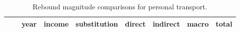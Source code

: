
\begin{table}
\footnotesize
\begin{center}
\caption{Rebound magnitude comparisons for personal transport.}
\label{tab:rebound_car_comparisons}
\begin{tabular}{ c l c c c c c c c }
\toprule
 & & year & income & substitution & direct & indirect & macro & total \\ 
\midrule

\bottomrule
\end{tabular}
\end{center}
\end{table}
